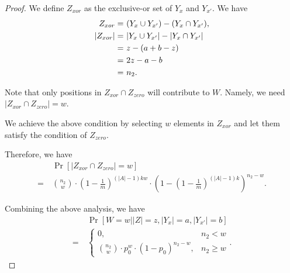 \begin{proof}
We define $Z_{xor}$ as the exclusive-or set of $Y_x$ and $Y_{x'}$. We have
\begin{align*}
    Z_{xor} = & ~ (Y_x \cup Y_{x'}) - (Y_x \cap Y_{x'}), \notag \\
    |Z_{xor}| = & ~ |Y_x \cup Y_{x'}| - |Y_x \cap Y_{x'}| \notag \\
    = & ~ z - (a +b - z) \notag \\
    = & ~ 2z - a - b \notag \\
    = & ~ n_2.
\end{align*}

Note that only positions in $Z_{xor} \cap Z_{zero}$ will contribute to $W$. Namely, we need $|Z_{xor} \cap Z_{zero}| = w$. 

We achieve the above condition by selecting $w$ elements in $Z_{xor}$ and let them satisfy the condition of $Z_{zero}$. 

Therefore, we have 
\begin{align*}
    & ~ \Pr[|Z_{xor} \cap Z_{zero}| = w] \\
    = & ~ \binom{n_2}{w} \cdot (1 - \frac{1}{m})^{(|A| - 1)kw} \cdot (1 - (1 - \frac{1}{m})^{(|A| - 1)k})^{n_2 - w}.
\end{align*}

Combining the above analysis, we have
\begin{align*}
    & ~ \Pr[W = w | |Z| = z, |Y_x| = a, |Y_{x'}| = b] \\
    = & ~ 
    \begin{cases}
        0,  &  n_2 < w \\
        \binom{n_2}{w} \cdot p_0^w \cdot (1 - p_0)^{n_2 - w}, & n_2 \geq w
    \end{cases}.
\end{align*}


\end{proof}


